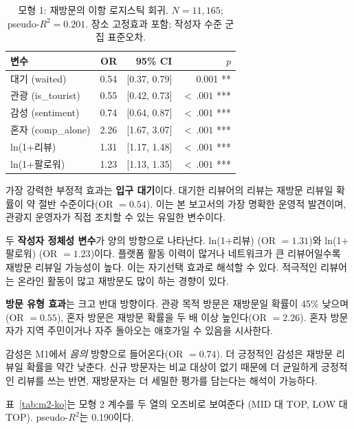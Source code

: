 \documentclass[10pt,a4paper]{article}
\newcommand{\subsect}[1]{\vspace{6pt}\noindent{\large\bfseries #1}\par\vspace{2pt}}
\begin{document}
\begin{table}[H]\centering
\caption{모형 1: 재방문의 이항 로지스틱 회귀. $N = 11{,}165$;
pseudo-$R^2 = 0.201$. 장소 고정효과 포함; 작성자 수준 군집 표준오차.}
\label{tab:m1-ko}
\footnotesize
\begin{tabular}{@{}lrrr@{}}
\toprule
변수 & OR & 95\% CI & $p$ \\
\midrule
대기 (waited)                 & 0.54 & [0.37, 0.79] & 0.001 ** \\
관광 (is\_tourist)             & 0.55 & [0.42, 0.73] & $<\,.001$ *** \\
감성 (sentiment)               & 0.74 & [0.64, 0.87] & $<\,.001$ *** \\
혼자 (comp\_alone)             & 2.26 & [1.67, 3.07] & $<\,.001$ *** \\
ln(1+리뷰)                     & 1.31 & [1.17, 1.48] & $<\,.001$ *** \\
ln(1+팔로워)                   & 1.23 & [1.13, 1.35] & $<\,.001$ *** \\
\bottomrule
\end{tabular}
\end{table}

가장 강력한 부정적 효과는 \textbf{입구 대기}이다. 대기한 리뷰어의
리뷰는 재방문 리뷰일 확률이 약 절반 수준이다(OR $= 0.54$). 이는
본 보고서의 가장 명확한 운영적 발견이며, 관광지 운영자가 직접
조치할 수 있는 유일한 변수이다.

두 \textbf{작성자 정체성 변수}가 양의 방향으로 나타난다.
ln(1$+$리뷰) (OR $= 1.31$)와 ln(1$+$팔로워) (OR $= 1.23$)이다. 플랫폼
활동 이력이 많거나 네트워크가 큰 리뷰어일수록 재방문 리뷰일 가능성이
높다. 이는 자기선택 효과로 해석할 수 있다. 적극적인 리뷰어는 온라인
활동이 많고 재방문도 많이 하는 경향이 있다.

\textbf{방문 유형 효과}는 크고 반대 방향이다. 관광 목적 방문은
재방문일 확률이 45\% 낮으며(OR $= 0.55$), 혼자 방문은 재방문 확률을
두 배 이상 높인다(OR $= 2.26$). 혼자 방문자가 지역 주민이거나 자주
돌아오는 애호가일 수 있음을 시사한다.

감성은 M1에서 \emph{음의} 방향으로 들어온다(OR $= 0.74$). 더 긍정적인
감성은 재방문 리뷰일 확률을 약간 낮춘다. 신규 방문자는 비교 대상이
없기 때문에 더 균일하게 긍정적인 리뷰를 쓰는 반면, 재방문자는 더
세밀한 평가를 담는다는 해석이 가능하다.

\subsect{4.2 모형 2 --- 별점}
표~\ref{tab:m2-ko}는 모형 2 계수를 두 열의 오즈비로 보여준다
(MID 대 TOP, LOW 대 TOP). pseudo-$R^2$는 0.190이다.
\end{document}

